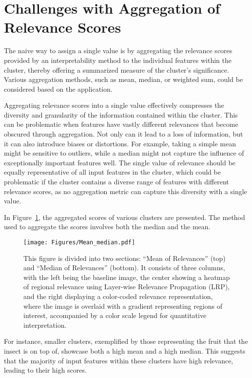 \section{Challenges with Aggregation of Relevance Scores}

The naive way to assign a single value is by aggregating the relevance scores provided by an interpretability method to the individual features within the cluster, thereby offering a summarized measure of the cluster's significance. Various aggregation methods, such as mean, median, or weighted sum, could be considered based on the application.

Aggregating relevance scores into a single value effectively compresses the diversity and granularity of the information contained within the cluster. This can be problematic when features have vastly different relevances that become obscured through aggregation. Not only can it lead to a loss of information, but it can also introduce biases or distortions. For example, taking a simple mean might be sensitive to outliers, while a median might not capture the influence of exceptionally important features well. The single value of relevance should be equally representative of all input features in the cluster, which could be problematic if the cluster contains a diverse range of features with different relevance scores, as no aggregation metric can capture this diversity with a single value.

In Figure~\ref{Fig:aggregating}, the aggregated scores of various clusters are presented. The method used to aggregate the scores involves both the median and the mean. 

\begin{figure}[ht!]
	\centering
	\texttt{[image: Figures/Mean\_median.pdf]}
	\caption{This figure is divided into two sections: ``Mean of Relevances'' (top) and ``Median of Relevances'' (bottom). It consists of three columns, with the left being the baseline image, the center showing a heatmap of regional relevance using Layer-wise Relevance Propagation (LRP), and the right displaying a color-coded relevance representation, where the image is overlaid with a gradient representing regions of interest, accompanied by a color scale legend for quantitative interpretation.}
	\label{Fig:aggregating}
\end{figure} 

For instance, smaller clusters, exemplified by those representing the fruit that the insect is on top of, showcase both a high mean and a high median. This suggests that the majority of input features within these clusters have high relevance, leading to their high scores.

